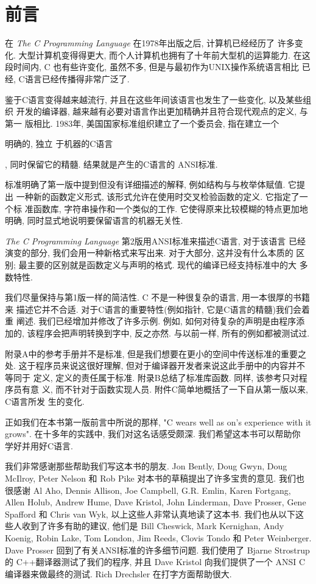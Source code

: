 
\chapter{前言}
在 \textit{The C Programming Language} 在1978年出版之后, 计算机已经经历了
许多变化. 大型计算机变得得更大, 而个人计算机也拥有了十年前大型机的运算能力.
在这段时间内, C 也有些许变化, 虽然不多, 但是与最初作为UNIX操作系统语言相比
已经, C语言已经传播得非常广泛了.

鉴于C语言变得越来越流行, 并且在这些年间该语言也发生了一些变化, 以及某些组织
开发的编译器, 越来越有必要对语言作出更加精确并且符合现代观点的定义, 与第一
版相比. 1983年, 美国国家标准组织建立了一个委员会,
指在建立一个\begin{myquotation}明确的, 独立%
于机器的C语言\end{myquotation}, 同时保留它的精髓. 结果就是产生的C语言的 
ANSI标准.

标准明确了第一版中提到但没有详细描述的解释, 例如结构与与枚举体赋值. 它提出
一种新的函数定义形式, 该形式允许在使用时交叉检验函数的定义. 它指定了一个标
准函数库, 字符串操作和一个类似的工作. 它使得原来比较模糊的特点更加地明确,
同时显式地说明要保留语言的机器无关性.

\textit{The C Programming Language} 第2版用ANSI标准来描述C语言, 对于该语言
已经演变的部分, 我们会用一种新格式来写出来. 对于大部分, 这并没有什么本质的
区别; 最主要的区别就是函数定义与声明的格式. 现代的编译已经支持标准中的大
多数特性.

我们尽量保持与第1版一样的简洁性. C 不是一种很复杂的语言, 用一本很厚的书籍来
描述它并不合适. 对于C语言的重要特性(例如指针, 它是C语言的精髓)我们会着重
阐述. 我们已经增加并修改了许多示例. 例如, 如何对待复杂的声明是由程序添加的,
该程序会把声明转换到字中, 反之亦然. 与以前一样, 所有的例如都被测试过.

附录A中的参考手册并不是标准, 但是我们想要在更小的空间中传送标准的重要之处.
这于程序员来说这很好理解, 但对于编译器开发者来说这此手册中的内容并不等同于
定义, 定义的责任属于标准. 附录B总结了标准库函数. 同样, 该参考只对程序员有意
义, 而不针对于函数实现人员. 附件C简单地概括了一下自从第一版以来, C语言所发
生的变化.

正如我们在本书第一版前言中所说的那样, "C wears well as on's experience with
it grows". 在十多年的实践中, 我们对这名话感受颇深. 我们希望这本书可以帮助你
学好并用好C语言.

我们非常感谢那些帮助我们写这本书的朋友. Jon Bently, Doug Gwyn, Doug McIlroy,
Peter Nelson 和 Rob Pike 对本书的草稿提出了许多宝贵的意见. 我们也很感谢
Al Aho, Dennis Allison, Joe Campbell, G.R. Emlin, Karen Fortgang, Allen
Holub, Andrew Hume, Dave Kristol, John Linderman, Dave Prosser, Gene 
Spafford 和 Chris van Wyk, 以上这些人非常认真地读了这本书. 我们也从以下这
些人收到了许多有助的建议, 他们是 Bill Cheswick, Mark Kernighan, Andy 
Koenig, Robin Lake, Tom London, Jim Reeds, Clovis Tondo 和 Peter Weinberger.
Dave Prosser 回到了有关ANSI标准的许多细节问题.  我们使用了 Bjarne Strostrup
的 C++翻译器测试了我们的程序, 并且 Dave Kristol 向我们提供了一个 ANSI C 
编译器来做最终的测试. Rich Drechsler 在打字方面帮助很大.

